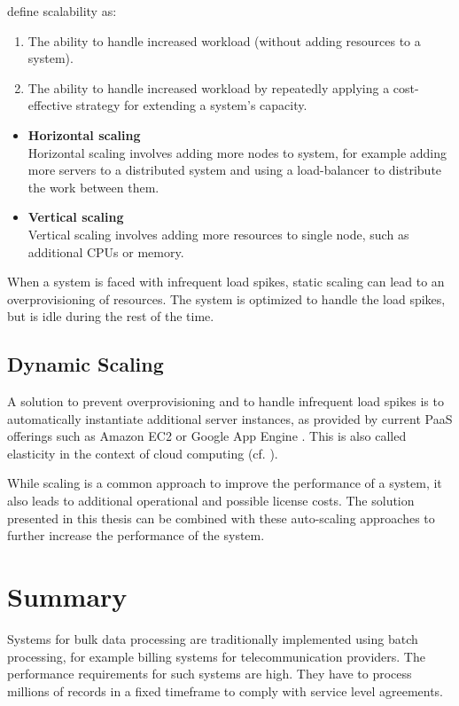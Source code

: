 \cite{weinstock2006system} define scalability as:
\begin{enumerate}
	\item The ability to handle increased workload (without adding resources to a system).
	\item The ability to handle increased workload by repeatedly applying a cost-effective strategy for extending a system's capacity.
\end{enumerate}

\begin{itemize}
	\item \textbf{Horizontal scaling}\\
	Horizontal scaling involves adding more nodes to system, for example adding more servers to a distributed system and using a load-balancer to distribute the work between them.
	\item \textbf{Vertical scaling}\\
	Vertical scaling involves adding more resources to single node, such as additional \acp{CPU} or memory.
\end{itemize}

When a system is faced with infrequent load spikes, static scaling can lead to an overprovisioning of resources. The system is optimized to handle the load spikes, but is idle during the rest of the time.

\subsection{Dynamic Scaling}
A solution to prevent overprovisioning and to handle infrequent load spikes is to automatically instantiate additional server instances, as provided by current \ac{PaaS} offerings such as Amazon EC2 \citep{ec2_autoscaling} or Google App Engine \citep{google_cloud_autoscaling}. This is also called elasticity in the context of cloud computing (cf. \cite{Herbst:2013ug}).

While scaling is a common approach to improve the performance of a system, it also leads to additional operational and possible license costs. The solution presented in this thesis can be combined with these auto-scaling approaches to further increase the performance of the system.

\section{Summary}
Systems for bulk data processing are traditionally implemented using batch processing, for example billing systems for telecommunication providers. The performance requirements for such systems are high. They have to process millions of records in a fixed timeframe to comply with service level agreements.

